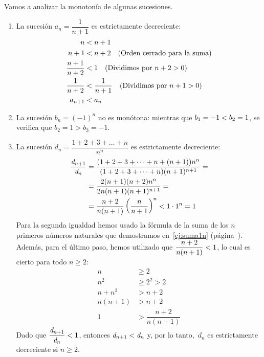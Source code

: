 \begin{ejemplo}
Vamos a analizar la monotonía de algunas sucesiones.
\begin{enumerate}
\item
La sucesión $a_n=\dfrac1{n+1}$ es estrictamente decreciente:
\begin{align*}
n &< n+1 \\
n+1 &< n+2 \quad\text{(Orden cerrado para la suma)}\\
\dfrac{n+1}{n+2} & < 1  \quad\text{(Dividimos por $n+2>0$)}\\
\dfrac1{n+2} &< \dfrac1{n+1}  \quad\text{(Dividimos por $n+1>0$)}\\
a_{n+1} &< a_n
\end{align*}
\item
La sucesión $b_n=(-1)^n$ no es monótona: mientras que $b_1=-1< b_2=1$, se verifica que $b_2=1>b_3=-1$.
\item
La sucesión $\mathit{d}_n=\dfrac{1+2+3+\dots+n}{n^n}$ es estrictamente decreciente:
\begin{align*}
\dfrac{\mathit{d}_{n+1}}{\mathit{d}_n} &= \dfrac{(1+2+3+\dots+n+(n+1))n^n}{(1+2+3+\dots+n)(n+1)^{n+1}}= \\
&= \dfrac{2(n+1)(n+2)n^n}{2n(n+1)(n+1)^{n+1}} =\\
&= \dfrac{n+2}{n(n+1)}\left(\dfrac{n}{n+1}\right)^{n} < 1\cdot 1^n =1
\end{align*}
Para la segunda igualdad hemos usado la fórmula de la suma de los $n$ primeros números naturales que demostramos en~\eqref{ej:suma1n} (página~\pageref{ej:suma1n}).
Además, para el último paso, hemos utilizado que $\dfrac{n+2}{n(n+1)}< 1$, lo cual es cierto para todo $n\ge 2$:
\begin{align*}
n &\ge 2 \\
n^2 & \ge 2^2 > 2 \\
n+n^2 & > n+2 \\
n(n+1) &> n+2 \\
1 &> \dfrac{n+2}{n(n+1)}
\end{align*}
Dado que $\dfrac{\mathit{d}_{n+1}}{\mathit{d}_n}< 1$, entonces $\mathit{d}_{n+1}< \mathit{d}_n$ y, por lo tanto,~$\mathit{d}_n$ es estrictamente decreciente si $n\ge 2$.


\end{enumerate}
\end{ejemplo}

